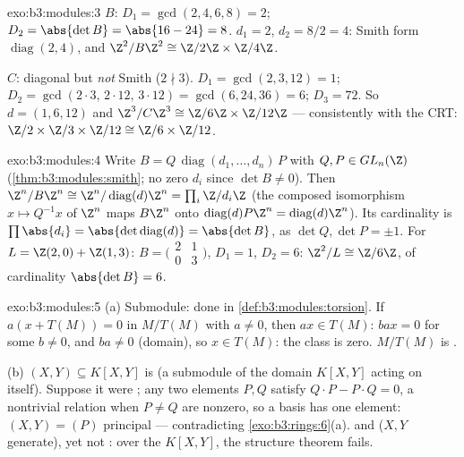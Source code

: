 \begin{solution}{exo:b3:modules:3}
$B$: $D_1 = \gcd(2,4,6,8) = 2$; $D_2 = \abs{\det B} = \abs{16 -
24} = 8$.  $d_1 = 2$, $d_2 = 8/2 = 4$: Smith
form $\operatorname{diag}(2, 4)$, and $\Z^2/B\Z^2 \cong \Z/2\Z
\times \Z/4\Z$.

$C$: diagonal but \emph{not} Smith ($2 \nmid 3$). $D_1 =
\gcd(2,3,12) = 1$; $D_2 = \gcd(2\cdot3,\, 2\cdot12,\, 3\cdot12) =
\gcd(6, 24, 36) = 6$; $D_3 = 72$. So $d = (1, 6, 12)$ and
$\Z^3/C\Z^3 \cong \Z/6\Z\times\Z/12\Z$ --- consistently with the
CRT: $\Z/2\times\Z/3\times\Z/12 \cong \Z/6\times\Z/12$.
\end{solution}

\begin{solution}{exo:b3:modules:4}
Write $B = Q\,\operatorname{diag}(d_1, \dots, d_n)\,P$ with $Q, P
\in GL_n(\Z)$ (\cref{thm:b3:modules:smith}; no zero $d_i$ since
$\det B \neq 0$). Then $\Z^n/B\Z^n \cong \Z^n/
\operatorname{diag}(d)\Z^n = \prod_i \Z/d_i\Z$ (the composed
isomorphism $x \mapsto Q^{-1}x$ of $\Z^n$ maps $B\Z^n$ onto
$\operatorname{diag}(d)P\Z^n = \operatorname{diag}(d)\Z^n$). Its
cardinality is $\prod \abs{d_i} = \abs{\det
\operatorname{diag}(d)} = \abs{\det B}$, as $\det Q, \det P = \pm
1$. For $L = \Z(2,0) + \Z(1,3)$: $B = \bigl(\begin{smallmatrix}2
& 1\\ 0 & 3\end{smallmatrix}\bigr)$, $D_1 = 1$, $D_2 = 6$: $\Z^2/L
\cong \Z/6\Z$, of cardinality $\abs{\det B} = 6$.
\end{solution}

\begin{solution}{exo:b3:modules:5}
(a) Submodule: done in \cref{def:b3:modules:torsion}. If $a(x +
T(M)) = 0$ in $M/T(M)$ with $a \neq 0$, then $ax \in T(M)$: $bax
= 0$ for some $b \neq 0$, and $ba \neq 0$ (domain), so $x \in
T(M)$: the class is zero. $M/T(M)$ is .

(b) $(X, Y) \subseteq K[X,Y]$ is  (a submodule of the
domain $K[X,Y]$ acting on itself). Suppose it were ; any two
elements $P, Q$ satisfy $Q\cdot P - P \cdot Q = 0$, a nontrivial
relation when $P \ne Q$ are nonzero, so a basis has one element:
$(X, Y) = (P)$ principal --- contradicting
\cref{exo:b3:rings:6}(a).  and 
($X, Y$ generate), yet not : over the  $K[X,Y]$, the
structure theorem fails.
\end{solution}

